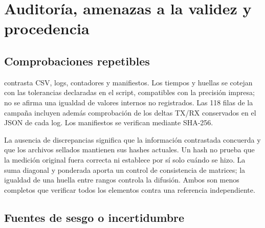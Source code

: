 \section{Auditoría, amenazas a la validez y procedencia}\label{sec:auditoria}

\subsection{Comprobaciones repetibles}

 contrasta CSV, logs, contadores y manifiestos. Los tiempos y huellas se cotejan con las tolerancias declaradas en el script, compatibles con la precisión impresa; no se afirma una igualdad de valores internos no registrados. Las 118 filas de la campaña incluyen además comprobación de los deltas TX/RX conservados en el JSON de cada log. Los manifiestos se verifican mediante SHA-256.

\begin{table}[H]\caption{Auditoría automática de las copias disponibles al reconstruir esta edición.}\label{tab:auditoria}

\end{table}

La ausencia de discrepancias significa que la información contrastada concuerda y que los archivos sellados mantienen sus hashes actuales. Un hash no prueba que la medición original fuera correcta ni establece por sí solo cuándo se hizo. La suma diagonal y ponderada aporta un control de consistencia de matrices; la igualdad de una huella entre rangos controla la difusión. Ambos son menos completos que verificar todos los elementos contra una referencia independiente.

\subsection{Fuentes de sesgo o incertidumbre}

